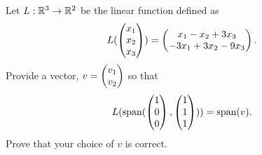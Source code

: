 \begin{question}
	\normalfont
	Let $L:{\mathbb R}^3\to{\mathbb R}^2$ be the linear function defined as
		\begin{align*}
			L(\begin{pmatrix} x_1\\ x_2\\ x_3\end{pmatrix}) = \begin{pmatrix} x_1-x_2+3x_3\\ -3x_1+3x_2-9x_3\end{pmatrix}.
		\end{align*}
		Provide a vector, $v=\begin{pmatrix} v_1\\ v_2\end{pmatrix}$ so that 
			\begin{align*}
				L(\textnormal{span}(\begin{pmatrix} 1\\ 0\\ 0\end{pmatrix}, \begin{pmatrix} 1\\ 1\\ 1\end{pmatrix} ) )= \textnormal{span}(v).
			\end{align*}
			Prove that your choice of $v$ is correct.
			
		
\end{question}